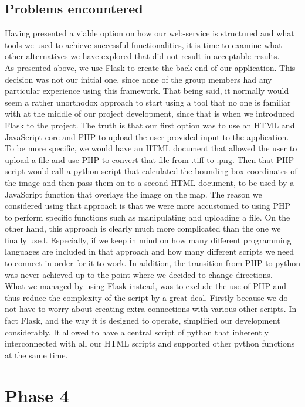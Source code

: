 \subsection{Problems encountered}
Having presented a viable option on how our web-service is structured and what tools we used to achieve successful functionalities, it is time to examine what other alternatives we have explored that did not result in acceptable results.\\
As presented above, we use Flask to create the back-end of our application. This decision was not our initial one, since none of the group members  had any particular experience using this framework. That being said, it normally would seem a rather unorthodox approach to start using a tool that no one is familiar with at the middle of our project development, since that is when we introduced Flask to the project. The truth is that our first option was to use an HTML and JavaScript core and PHP to upload the user provided input to the application. To be more specific, we would have an HTML document that allowed the user to upload a file and use PHP to convert that file from .tiff to .png. Then that PHP script would call a python script that calculated the bounding box coordinates of the image and then pass them on to a second HTML document, to be used by a JavaScript function that overlays the image on the map. The reason we considered using that approach is that we were more accustomed to using PHP to perform specific functions such as manipulating and uploading a file. On the other hand, this approach is clearly much more complicated than the one we finally used. Especially, if we keep in mind on how many different programming languages are included in that approach and how many different scripts we need to connect in order for it to work.  In addition, the transition from PHP to python was never achieved up to the point where we decided to change directions.\\

What we managed by using Flask instead, was to exclude the use of PHP and thus reduce the complexity of the script by a great deal. Firstly because we do not have to worry about creating extra connections with various other scripts. In fact Flask, and the way it is designed to operate, simplified our development considerably. It allowed to have a central script of python that inherently interconnected with all our HTML scripts and supported other python functions at the same time.

\section{Phase 4}
\label{ch:phase4}

